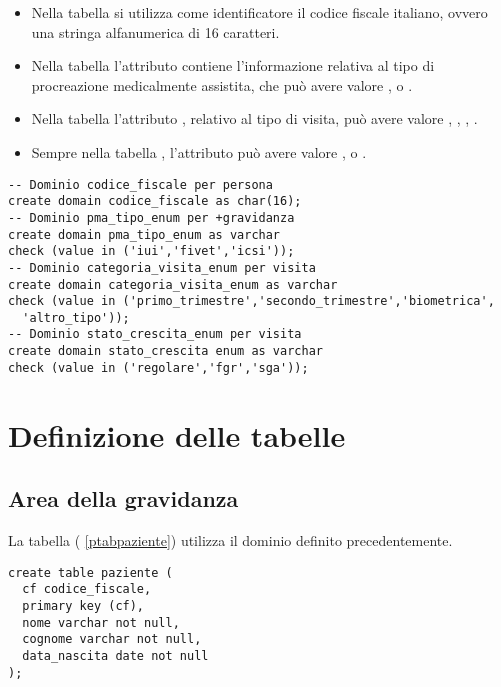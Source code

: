 \begin{itemize}
\item Nella tabella  si utilizza come identificatore il codice fiscale italiano, ovvero una stringa alfanumerica di 16 caratteri.
\item Nella tabella  l'attributo  contiene l'informazione relativa al tipo di procreazione medicalmente assistita, che può avere valore ,  o .
\item Nella tabella  l'attributo , relativo al tipo di visita, può avere valore , , , .
\item Sempre nella tabella , l'attributo  può avere valore ,  o .
\end{itemize}

\begin{lstlisting}[float,caption={Definizione dei domini.},label=pdom]
-- Dominio codice_fiscale per persona
create domain codice_fiscale as char(16);
-- Dominio pma_tipo_enum per +gravidanza
create domain pma_tipo_enum as varchar
check (value in ('iui','fivet','icsi'));
-- Dominio categoria_visita_enum per visita
create domain categoria_visita_enum as varchar
check (value in ('primo_trimestre','secondo_trimestre','biometrica',
  'altro_tipo'));
-- Dominio stato_crescita_enum per visita
create domain stato_crescita enum as varchar
check (value in ('regolare','fgr','sga'));
\end{lstlisting}

\section{Definizione delle tabelle}


\subsection{Area della gravidanza}

La tabella  (\lstlistingname{} \ref{ptabpaziente}) utilizza il dominio  definito precedentemente.

\begin{lstlisting}[float,caption={Definizione della tabella \tab{paziente}.},label=ptabpaziente]
create table paziente (
  cf codice_fiscale,
  primary key (cf),
  nome varchar not null,
  cognome varchar not null,
  data_nascita date not null
);
\end{lstlisting}


